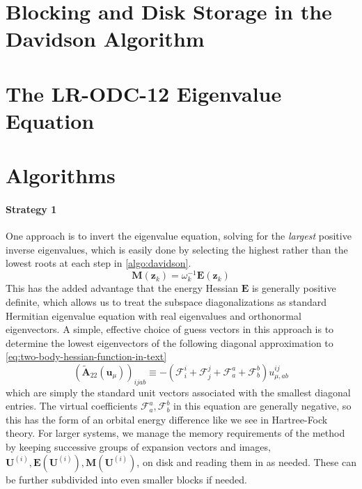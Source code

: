 \section{Blocking and Disk Storage in the Davidson Algorithm}
\label{sec:davidson:disk}


\section{The LR-ODC-12 Eigenvalue Equation}


\section{Algorithms}
\label{sec:algorithms}



\paragraph{Strategy 1}
One approach is to invert the eigenvalue equation, solving for the {\itshape
largest} positive inverse eigenvalues, which is easily done by selecting the
highest rather than the lowest roots at each step in \cref{algo:davidson}.
\begin{equation}
    \mathbf{M}(\mathbf{z}_k)
    =
    \omega_k^{-1}
    \mathbf{E}(\mathbf{z}_k)
\end{equation}
This has the added advantage that the energy Hessian \(\mathbf{E}\) is generally
positive definite, which allows us to treat the subspace diagonalizations as
standard Hermitian eigenvalue equation with real eigenvalues and orthonormal
eigenvectors.
A simple, effective choice of guess vectors in this approach is to determine the
lowest eigenvectors of the following diagonal approximation to
\cref{eq:two-body-hessian-function-in-text}
\begin{equation}
    (\tilde{\mathbf{A}}_{22}(\mathbf{u}_{\mu}))_{ijab}
    \equiv
    -
    (
        \mathcal{F}_i^i
        +
        \mathcal{F}_j^j
        +
        \mathcal{F}_a^a
        +
        \mathcal{F}_b^b
    )
    u_{\mu,ab}^{ij}
\end{equation}
which are simply the standard unit vectors associated with the smallest diagonal
entries.
The virtual coefficients \(\mathcal{F}_a^a,\mathcal{F}_b^b\) in this equation
are generally negative, so this has the form of an orbital energy difference
like we see in Hartree-Fock theory.
For larger systems, we manage the memory requirements of the method by keeping
successive groups of expansion vectors and images,
\(
    \mathbf{U}^{(i)},
    \mathbf{E}(\mathbf{U}^{(i)}),
    \mathbf{M}(\mathbf{U}^{(i)})
\),
on disk and reading them in as needed.
These can be further subdivided into even smaller blocks if needed.


